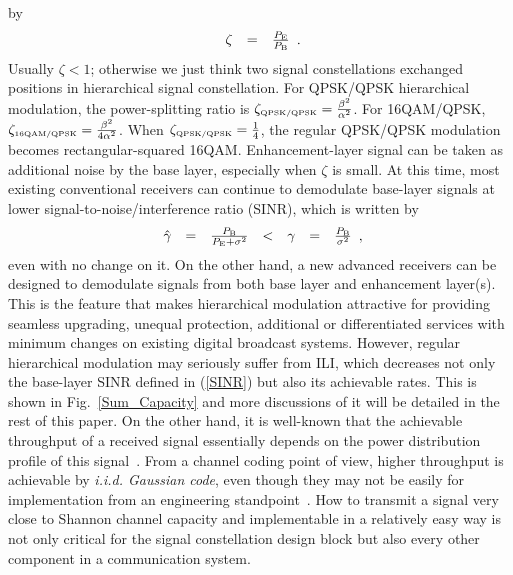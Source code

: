 \documentclass[10pt,fleqn, twocolumn]{IEEEtran}
\begin{document}
by
\begin{equation}
\begin{array}{rcl}
\zeta& = & \frac{P_{\rm E}}{P_{\rm B}}
\end{array}.\label{power_ratio}
\end{equation}
\noindent Usually $\zeta < 1$; otherwise we just think two signal
constellations exchanged positions in hierarchical signal
constellation. For QPSK/QPSK hierarchical modulation, the
power-splitting ratio is $\zeta_{\mbox{\tiny QPSK/QPSK}}=
\frac{\beta^{2}}{\alpha^2}$. For 16QAM/QPSK, $\zeta_{\mbox{\tiny
16QAM/QPSK}}= \frac{\beta^{2}}{4\alpha^2}$. When
$\zeta_{\mbox{\tiny QPSK/QPSK}}=\frac{1}{4}$, the regular
QPSK/QPSK modulation becomes rectangular-squared 16QAM.
Enhancement-layer signal can be taken as additional noise by the
base layer, especially when $\zeta$ is small. At this time, most
existing conventional receivers can continue to demodulate
base-layer signals at lower signal-to-noise/interference ratio
(SINR), which is written by
\begin{equation}
\begin{array}{rcccccl}
\hat{\gamma}& = & \frac{P_{\rm B}}{P_{\rm
E}+\sigma^2}&<&\gamma&=&\frac{P_{\rm B}}{\sigma^2}
\end{array},\label{SINR}
\end{equation}
\noindent even with no change on it. On the other hand, a new
advanced receivers can be designed to demodulate signals from both
base layer and enhancement layer(s). This is the feature that
makes hierarchical modulation attractive for providing seamless
upgrading, unequal protection, additional or differentiated
services with minimum changes on existing digital broadcast
systems. However, regular hierarchical modulation may seriously
suffer from ILI, which decreases not only the base-layer SINR
defined in (\ref{SINR}) but also its achievable rates. This is
shown in Fig.~\ref{Sum_Capacity} and more discussions of it will
be detailed in the rest of this paper. On the other hand, it is
well-known that the achievable throughput of a received signal
essentially depends on the power distribution profile of this
signal~\cite{Unge82}. From a channel coding point of view, higher
throughput is achievable by {\em i.i.d. Gaussian code}, even
though they may not be easily for implementation from an
engineering standpoint~\cite{Cover72}. How to transmit a signal
very close to Shannon channel capacity and implementable in a
relatively easy way is not only critical for the signal
constellation design block but also every other component in a
communication system.
\end{document}
